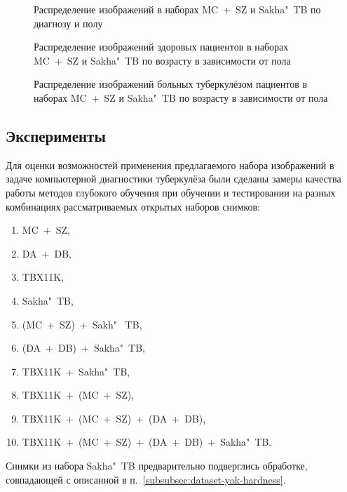 \begin{figure}[ht]
	\caption{Распределение изображений в наборах MC~+~SZ и Sakha"~TB по диагнозу и полу}
	\label{fig:sex-distr}
\end{figure}

\begin{figure}[ht]
	\caption{Распределение изображений здоровых пациентов в наборах MC~+~SZ и Sakha"~TB по возрасту в зависимости от пола}
	\label{fig:age-distr-healthy}
\end{figure}

\begin{figure}[ht]
	\caption{Распределение изображений больных туберкулёзом пациентов в наборах MC~+~SZ и Sakha"~TB по возрасту в зависимости от пола}
	\label{fig:age-distr-tb}
\end{figure}

\subsection{Эксперименты}

Для оценки возможностей применения предлагаемого набора изображений в задаче компьютерной диагностики туберкулёза были сделаны замеры качества работы методов глубокого обучения при обучении и тестировании на разных комбинациях рассматриваемых открытых наборов снимков:

\begin{enumerate}[beginpenalty=10000]
	\item MC~+~SZ,
	\item DA~+~DB,
	\item TBX11K,
	\item Sakha"~TB,
	\item (MC~+~SZ)~+~Sakh"~ TB,
	\item (DA~+~DB)~+~Sakha"~TB,
	\item TBX11K~+~Sakha"~TB,
	\item TBX11K~+~(MC~+~SZ),
	\item TBX11K~+~(MC~+~SZ)~+~(DA~+~DB),
	\item TBX11K~+~(MC~+~SZ)~+~(DA~+~DB)~+~Sakha"~TB.
\end{enumerate}

Снимки из набора Sakha"~TB предварительно подверглись обработке, совпадающей с описанной в п.~\ref{subsubsec:dataset-yak-hardness}.

